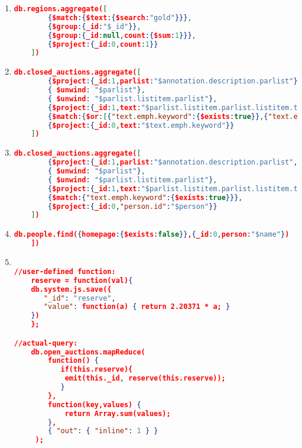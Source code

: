\begin{enumerate}[label=Q\arabic*]
    \item \label{mongodb-q-14}%
	\begin{lstlisting}[language=JSON,   basicstyle=\scriptsize]
	  db.regions.aggregate([
		{$match:{$text:{$search:"gold"}}},
		{$group:{_id:"$_id"}},
		{$group:{_id:null,count:{$sum:1}}},
		{$project:{_id:0,count:1}}
	])
	\end{lstlisting}
	
    \item \label{mongodb-q-15}%
	\begin{lstlisting}[language=JSON,   basicstyle=\scriptsize]
	 db.closed_auctions.aggregate([
		{$project:{_id:1,parlist:"$annotation.description.parlist"}},
		{ $unwind: "$parlist"},
		{ $unwind: "$parlist.listitem.parlist"},
		{$project:{_id:1,text:"$parlist.listitem.parlist.listitem.text"}},
		{$match:{$or:[{"text.emph.keyword":{$exists:true}},{"text.emph.keyword.childtext":{$exists:true}},{"text.emph.keyword.child":{$exists:true}}]}},
		{$project:{_id:0,text:"$text.emph.keyword"}}
	])
	\end{lstlisting}
	
    \item \label{mongodb-q-16}%
	\begin{lstlisting}[language=JSON,   basicstyle=\scriptsize]
	  db.closed_auctions.aggregate([
		{$project:{_id:1,parlist:"$annotation.description.parlist",person:"$seller.person"}},
		{ $unwind: "$parlist"},
		{ $unwind: "$parlist.listitem.parlist"},
		{$project:{_id:1,text:"$parlist.listitem.parlist.listitem.text",person:1}},
		{$match:{"text.emph.keyword":{$exists:true}}},
		{$project:{_id:0,"person.id":"$person"}}
	])
	\end{lstlisting}	

    \item \label{mongodb-q-17}%
	\begin{lstlisting}[language=JSON,   basicstyle=\scriptsize]
	  db.people.find({homepage:{$exists:false}},{_id:0,person:"$name"})
	])
	\end{lstlisting}	

    \item \label{mongodb-q-18}%
	\begin{lstlisting}[language=JSON,   basicstyle=\scriptsize]
	
//user-defined function:
    reserve = function(val){
    db.system.js.save({ 
       "_id": "reserve", 
       "value": function(a) { return 2.20371 * a; } 
    })
    };

//actual-query:
    db.open_auctions.mapReduce(
        function() {
           if(this.reserve){
            emit(this._id, reserve(this.reserve));
           }    
        },
        function(key,values) {
            return Array.sum(values);
        },
        { "out": { "inline": 1 } }
     );
\end{lstlisting}	


\end{enumerate}
